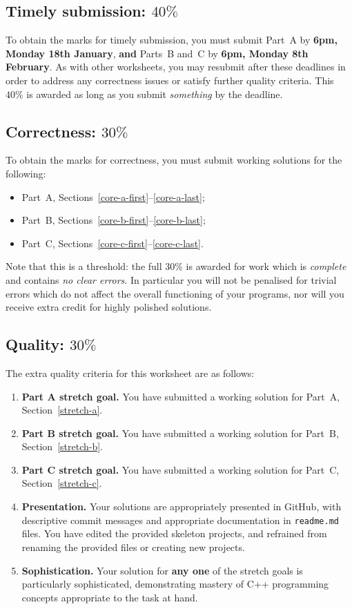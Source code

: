 \documentclass{scrartcl}
\begin{document}
\subsection*{Timely submission: $40\%$}

To obtain the marks for timely submission, you must submit Part~A by \textbf{6pm, Monday 18th January},
\textbf{and} Parts~B and~C by \textbf{6pm, Monday 8th February}.
As with other worksheets, you may resubmit after these deadlines in order to address any correctness issues
or satisfy further quality criteria. This $40\%$ is awarded as long as you submit \emph{something} by the deadline.

\subsection*{Correctness: $30\%$}

To obtain the marks for correctness, you must submit working solutions for the following:
\begin{itemize}
\item Part~A, Sections~\ref{core-a-first}--\ref{core-a-last};
\item Part~B, Sections~\ref{core-b-first}--\ref{core-b-last};
\item Part~C, Sections~\ref{core-c-first}--\ref{core-c-last}.
\end{itemize}
Note that this is a threshold: the full $30\%$ is awarded for work which is \emph{complete}
and contains \emph{no clear errors}. In particular you will not be penalised for trivial errors which do not
affect the overall functioning of your programs, nor will you receive extra credit for highly polished solutions.

\subsection*{Quality: $30\%$}

The extra quality criteria for this worksheet are as follows:
\begin{enumerate}
\item\textbf{Part A stretch goal.} You have submitted a working solution for Part~A, Section~\ref{stretch-a}.
\item\textbf{Part B stretch goal.} You have submitted a working solution for Part~B, Section~\ref{stretch-b}.
\item\textbf{Part C stretch goal.} You have submitted a working solution for Part~C, Section~\ref{stretch-c}.
\item\textbf{Presentation.} Your solutions are appropriately presented in GitHub, with descriptive commit messages
	and appropriate documentation in \texttt{readme.md} files.
	You have edited the provided skeleton projects, and refrained from renaming the provided files or creating new projects.
\item\textbf{Sophistication.} Your solution for \textbf{any one} of the stretch goals is particularly sophisticated,
	demonstrating mastery of C++ programming concepts appropriate to the task at hand.
\end{enumerate}
\end{document}
